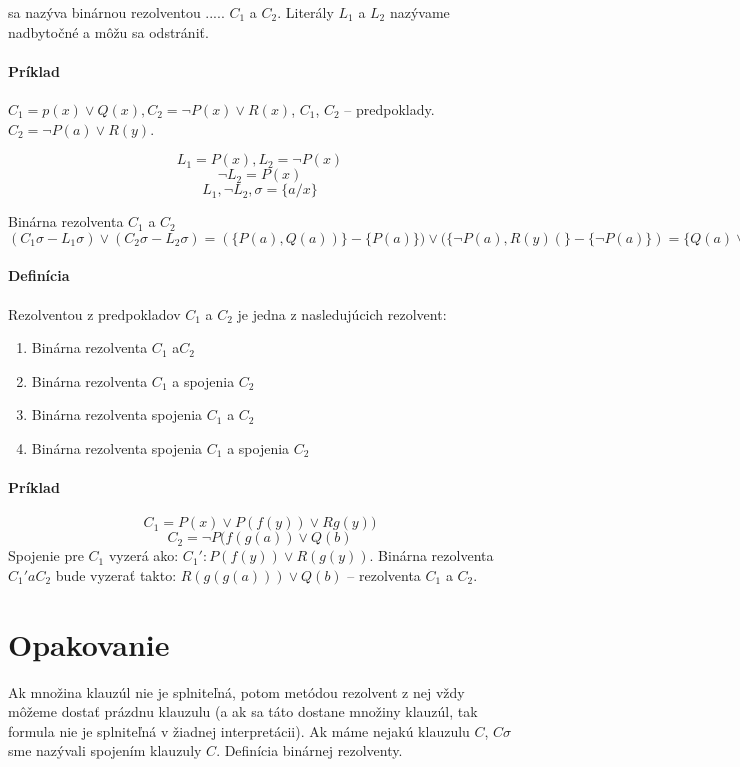 sa nazýva binárnou rezolventou ..... $C_1$ a $C_2$. Literály $L_1$ a $L_2$ nazývame
nadbytočné a môžu sa odstrániť.

\paragraph{Príklad} $C_1 = p(x) \lor Q(x), C_2 = \neg P(x) \lor R(x)$, $C_1$,
$C_2$ -- predpoklady. $C_2 = \neg P(a) \lor R(y)$.

$$L_1 = P(x), L_2 = \neg P(x)$$
$$\neg L_2 = P(x)$$
$$L_1, \neg L_2, \sigma = \{a/x\}$$

Binárna rezolventa $C_1$ a $C_2$ $(C_1\sigma - L_1\sigma) \lor (C_2\sigma -
L_2\sigma) = (\{P(a),Q(a))\} - \{P(a)\}) \lor (\{\neg P(a),R(y)(\}-\{\neg
P(a)\}) = \{Q(a)\lor R(y)\}$

\paragraph{Definícia} Rezolventou z predpokladov $C_1$ a $C_2$ je jedna z
nasledujúcich rezolvent:
\begin{enumerate}
	\item Binárna rezolventa $C_1$ a$C_2$
	\item Binárna rezolventa $C_1$ a spojenia $C_2$
	\item Binárna rezolventa spojenia $C_1$ a $C_2$
	\item Binárna rezolventa spojenia $C_1$ a spojenia $C_2$
\end{enumerate}

\paragraph{Príklad} $$C_1 = P(x) \lor P(f(y))\lor Rg(y))$$
$$ C_2 = \neg P(f(g(a)) \lor Q(b)$$
Spojenie pre $C_1$ vyzerá ako: $C_1': P(f(y)) \lor R(g(y))$.
Binárna rezolventa $C_1' a C_2$ bude vyzerať takto: $R(g(g(a))) \lor Q(b)$ --
rezolventa $C_1$ a $C_2$.


\section{Opakovanie}
	Ak množina klauzúl nie je splniteľná, potom metódou rezolvent z nej vždy
	môžeme dostať prázdnu klauzulu (a ak sa táto dostane množiny klauzúl,
	tak formula nie je splniteľná v žiadnej interpretácii). Ak máme nejakú
	klauzulu $C$, $C\sigma$ sme nazývali spojením klauzuly $C$. Definícia
	binárnej rezolventy. 


